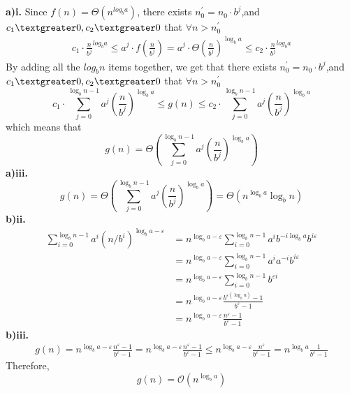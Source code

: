 \documentclass[12pt,a4paper]{article}
\theoremstyle{definition}
\begin{document}
\subsection{}
\textbf{a)i.} Since $f(n)=\Theta (n^{log_ba})$, there exists $n_0^{'} = n_0 \cdot b^j$,and $c_1 \textgreater 0,c_2 \textgreater 0$ that $\forall n>n_0^{'}$
\begin{align*}
  c_1 \cdot \frac{n}{b^j}^{log_ba}\leq a^{j} \cdot f(\frac{n}{b^j}) = a^{j} \cdot \Theta (\frac{n}{b^j})^{\log_ba} \leq c_2 \cdot \frac{n}{b^j}^{log_ba} 
\end{align*}
By adding all the $log_bn$ items together, we get that there exists $n_0^{'} = n_0 \cdot b^j$,and $c_1 \textgreater 0,c_2 \textgreater 0$ that $\forall n>n_0^{'}$
$$
c_1 \cdot \sum_{j=0}^{\log_bn-1}a^j(\frac{n}{b^j})^{\log_ba} \leq g(n) \leq c_2 \cdot \sum_{j=0}^{\log_bn-1}a^j(\frac{n}{b^j})^{\log_ba}
$$
which means that
$$
  g(n)=\Theta(\sum_{j=0}^{\log_bn-1}a^j(\frac{n}{b^j})^{\log_ba})
$$
\textbf{a)iii.}
$$
g(n)=\Theta\left(\sum_{j=0}^{\log _{b} n-1} a^{j}\left(\frac{n}{b^{j}}\right)^{\log _{b} a}\right) = \Theta(n^{\log _{b} a} \log _{b} n)
$$
\textbf{b)ii.}
\begin{align*}
 \sum_{i=0}^{\log _{b} n -1} a^{i}\left(n / b^{i}\right)^{\log _{b} a-\varepsilon}&=n^{\log _{b} a-\varepsilon} \sum_{i=0}^{\log _{b} n -1} a^{i} b^{-i \log _{b} a} b^{i \varepsilon}\\
  &=n^{\log _{b} a-\varepsilon} \sum_{i=0}^{\log _{b} n -1} a^{i} a^{-i} b^{i \varepsilon} \\
  &=n^{\log _{b} a-\varepsilon} \sum_{i=0}^{\log _{b} n -1} b^{\varepsilon i}\\
  &=n^{\log _{b} a-\varepsilon} \frac{b^{\varepsilon\left(\log _{b} n\right)}-1}{b^{\varepsilon}-1}\\
  &=n^{\log _{b} a-\varepsilon} \frac{n^{\varepsilon}-1}{b^{\varepsilon}-1}
\end{align*}
\textbf{b)iii.}
\begin{align*}
  g(n) =n^{\log _{b} a-\varepsilon} \frac{n^{\varepsilon}-1}{b^{\varepsilon}-1}=n^{\log _{b} a-\varepsilon} \frac{n^{\varepsilon}-1}{b^{\varepsilon}-1} \leq n^{\log _{b} a-\varepsilon} \frac{n^{\varepsilon}}{b^{\varepsilon}-1}=n^{\log _{b} a} \frac{1}{b^{\varepsilon}-1}
\end{align*}
Therefore,
$$
  g(n) = \mathcal{O}(n^{\log_ba})
$$
\end{document}
